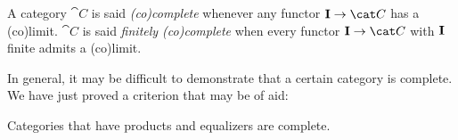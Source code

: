 
\begin{definition}
A category \(\cat C\) is said {\em (co)complete} whenever any functor \({\bf I} \to \cat C\) has a (co)limit. \(\cat C\) is said {\em finitely (co)complete} when every functor \({\bf I} \to \cat C\) with \({\bf I}\) finite admits a (co)limit.
\end{definition}

 In general, it may be difficult to demonstrate that a certain category is complete. We have just proved a criterion that may be of aid:

\begin{proposition}\label{proposition:Completeness}
Categories that have products and equalizers are complete. 
\end{proposition}

